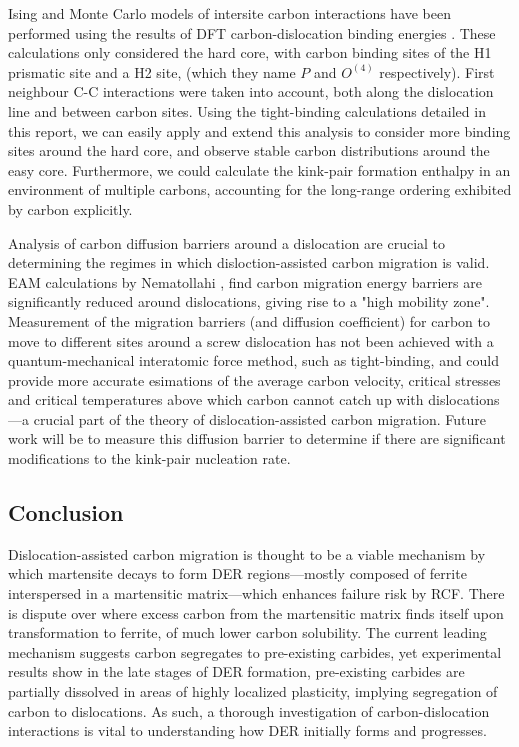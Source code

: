 \documentclass[a4paper,11pt]{article}
\numberwithin{equation}{chapter}
\numberwithin{listing}{chapter}
\begin{document}
Ising and Monte Carlo models of intersite carbon interactions have been performed using the
results of DFT carbon-dislocation binding energies \cite{Lthi2019}. These calculations only
considered the hard core, with carbon binding sites of the H1 prismatic site and a H2 site, (which
they name \(P\) and \(O^{(4)}\) respectively). First neighbour C-C interactions were taken
into account, both along the dislocation line and between carbon sites. Using the tight-binding
calculations detailed in this report, we can easily apply and extend this analysis to consider more
binding sites around the hard core, and observe stable carbon distributions around the
easy core. Furthermore, we could calculate the kink-pair formation enthalpy in an
environment of multiple carbons, accounting for the long-range ordering exhibited by
carbon explicitly.


Analysis of carbon diffusion barriers around a dislocation are crucial to determining
the regimes in which disloction-assisted carbon migration is valid. EAM calculations by
Nematollahi \cite{Nematollahi2016}, find carbon migration energy barriers are
significantly reduced around dislocations, giving rise to a "high mobility zone".
Measurement of the migration barriers (and diffusion coefficient) for carbon to move to
different sites around a screw dislocation has not been achieved with a
quantum-mechanical interatomic force method, such as tight-binding, and could provide more accurate
esimations of the average carbon velocity, critical stresses and critical temperatures
above which carbon cannot catch up with dislocations---a crucial part of the theory of
dislocation-assisted carbon migration. Future work will be to measure this diffusion
barrier to determine if there are significant modifications to the kink-pair nucleation
rate.

\subsection{Conclusion}
\label{sec:orgfa459b6}

Dislocation-assisted carbon migration is thought to be a viable mechanism by which martensite
decays to form DER regions---mostly composed of ferrite interspersed in a martensitic
matrix---which enhances failure risk by RCF. There is dispute over where excess carbon from the
martensitic matrix finds itself upon transformation to ferrite, of much lower carbon
solubility. The current leading mechanism suggests carbon segregates to pre-existing carbides, yet
experimental results show in the late stages of DER formation, pre-existing carbides are partially
dissolved in areas of highly localized plasticity, implying segregation of carbon to
dislocations. As such, a thorough investigation of carbon-dislocation interactions is vital to
understanding how DER initially forms and progresses.
\end{document}
